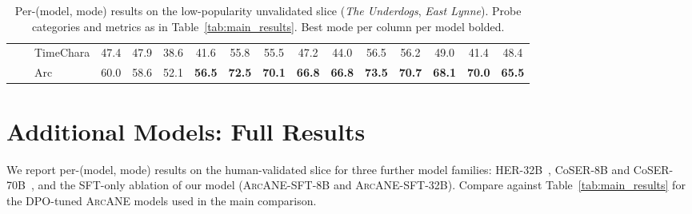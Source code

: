 \documentclass{llmxive}
\providecommand{\ours}{\textsc{ArcANE}}
\begin{document}
\begin{table}[t]
\begin{tabular}{lllccccccccccccc}
 &  & TimeChara & 47.4 & 47.9 & 38.6 & 41.6 & 55.8 & 55.5 & 47.2 & 44.0 & 56.5 & 56.2 & 49.0 & 41.4 & 48.4 \\
 &  & \cellcolor{yellow!15} Arc & \cellcolor{yellow!15} 60.0 & \cellcolor{yellow!15} 58.6 & \cellcolor{yellow!15} 52.1 & \cellcolor{yellow!15} \textbf{56.5} & \cellcolor{yellow!15} \textbf{72.5} & \cellcolor{yellow!15} \textbf{70.1} & \cellcolor{yellow!15} \textbf{66.8} & \cellcolor{yellow!15} \textbf{66.8} & \cellcolor{yellow!15} \textbf{73.5} & \cellcolor{yellow!15} \textbf{70.7} & \cellcolor{yellow!15} \textbf{68.1} & \cellcolor{yellow!15} \textbf{70.0} & \cellcolor{yellow!15} \textbf{65.5} \\
\bottomrule
\end{tabular}
\caption{Per-(model, mode) results on the low-popularity unvalidated slice (\emph{The Underdogs}, \emph{East Lynne}). Probe categories and metrics as in Table~\ref{tab:main_results}. Best mode per column per model bolded.}
\label{tab:main_results_extra3}
\end{table}

\section{Additional Models: Full Results\label{app:added-results}}

We report per-(model, mode) results on the human-validated slice for three further model families: HER-32B~\cite{du2026herhumanlikereasoningreinforcement}, CoSER-8B and CoSER-70B~\cite{wang2025coser}, and the SFT-only ablation of our model (\ours{}-SFT-8B and \ours{}-SFT-32B). Compare against Table~\ref{tab:main_results} for the DPO-tuned \ours{} models used in the main comparison.
\end{document}
